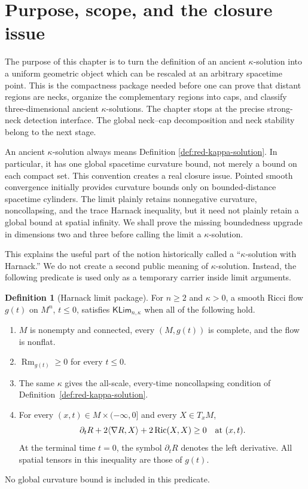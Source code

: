 \documentclass[10pt]{coll-l}
\theoremstyle{definition}
\newtheorem{definition}[theorem]{Definition}
\theoremstyle{remark}
\numberwithin{section}{chapter}
\numberwithin{equation}{chapter}
\newcommand{\Ric}{\operatorname{Ric}}
\newcommand{\Rm}{\operatorname{Rm}}
\begin{document}
\section{Purpose, scope, and the closure issue}
\label{sec:ksol-purpose}

The purpose of this chapter is to turn the definition of an ancient
$\kappa$-solution into a uniform geometric object which can be rescaled at
an arbitrary spacetime point.  This is the compactness package needed before
one can prove that distant regions are necks, organize the complementary
regions into caps, and classify three-dimensional ancient $\kappa$-solutions.
The chapter stops at the precise strong-neck detection interface.  The
global neck--cap decomposition and neck stability belong to the next stage.

An ancient $\kappa$-solution always means Definition
\ref{def:red-kappa-solution}.  In particular, it has one global spacetime
curvature bound, not merely a bound on each compact set.  This convention
creates a real closure issue.  Pointed smooth convergence initially provides
curvature bounds only on bounded-distance spacetime cylinders.  The limit
plainly retains nonnegative curvature, noncollapsing, and the trace Harnack
inequality, but it need not plainly retain a global bound at spatial
infinity.  We shall prove the missing boundedness upgrade in dimensions two
and three before calling the limit a $\kappa$-solution.

This explains the useful part of the notion historically called a
``$\kappa$-solution with Harnack.''  We do not create a second public meaning
of $\kappa$-solution.  Instead, the following predicate is used only as a
temporary carrier inside limit arguments.

\begin{definition}[Harnack limit package]
\label{def:ksol-Harnack-limit-package}
For $n\geq2$ and $\kappa>0$, a smooth Ricci flow $g(t)$ on $M^n$,
$t\leq0$, satisfies
$\mathsf{KLim}_{n,\kappa}$ when all of the following hold.
\begin{enumerate}
\item $M$ is nonempty and connected, every $(M,g(t))$ is complete, and the
      flow is nonflat.
\item $\Rm_{g(t)}\geq0$ for every $t\leq0$.
\item The same $\kappa$ gives the all-scale, every-time noncollapsing
      condition of Definition~\ref{def:red-kappa-solution}.
\item For every $(x,t)\in M\times(-\infty,0]$ and every
      $X\in T_xM$,
\begin{equation}
 \partial_tR+2\langle\nabla R,X\rangle+2\Ric(X,X)\geq0
 \quad\hbox{at }(x,t).                              \label{eq:ksol-KLim-Harnack}
\end{equation}
      At the terminal time $t=0$, the symbol $\partial_tR$ denotes the
      left derivative.  All spatial tensors in this inequality are those
      of $g(t)$.
\end{enumerate}
No global curvature bound is included in this predicate.
\end{definition}
\end{document}
